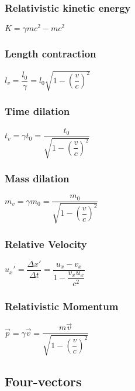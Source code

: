 \subsubsection{Relativistic kinetic energy}
\begin{itemize}
\itemt \( K = \gamma mc^2 - mc^2 \)
\end{itemize}

\subsubsection{Length contraction}
\begin{itemize}
\itemt \( l_v = \dfrac{l_0}{\gamma} = l_0\sqrt{1-\left(\dfrac{v}{c}\right)^2} \)
\end{itemize}

\subsubsection{Time dilation}
\begin{itemize}
\itemt \( t_v = \gamma t_0 = \dfrac{t_0}{\sqrt{1-\left(\dfrac{v}{c}\right)^2}}\)
\end{itemize}

\subsubsection{Mass dilation}
\begin{itemize}
\itemt \( m_v = \gamma m_0 = \dfrac{m_0}{\sqrt{1-\left(\dfrac{v}{c}\right)^2}}\)
\end{itemize}

\subsubsection{Relative Velocity}
\begin{itemize}
\itemt \( u_x'= \dfrac{\Delta x'}{\Delta  t} = \dfrac{u_x-v_x}{1-\dfrac{v_xu_x}{c^2}} \)
\end{itemize}

\subsubsection{Relativistic Momentum}
\begin{itemize}
\itemt \( \vec{p} = \gamma \vec{v} = \dfrac{m\vec{v}}{\sqrt{1-\left(\dfrac{v}{c}\right)^2}} \)
\end{itemize}

\subsection{Four-vectors}
\def\arraystretch{1}
